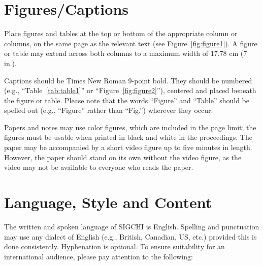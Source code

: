 \documentclass{sigchi}
\begin{document}
\section{Figures/Captions}

Place figures and tables at the top or bottom of the appropriate
column or columns, on the same page as the relevant text
(see Figure~\ref{fig:figure1}). A figure or table may extend across both
columns to a maximum width of 17.78 cm (7 in.).

Captions should be Times New Roman 9-point bold. They should be numbered (e.g.,
``Table~\ref{tab:table1}'' or ``Figure~\ref{fig:figure2}''), centered
and placed beneath the figure or table. Please note that the words
``Figure'' and ``Table'' should be spelled out (e.g., ``Figure''
rather than ``Fig.'') wherever they occur.

Papers and notes may use color figures, which are included in the page
limit; the figures must be usable when printed in black and white in
the proceedings. The paper may be accompanied by a short video figure
up to five minutes in length. However, the paper should stand on its
own without the video figure, as the video may not be available to
everyone who reads the paper.

\section{Language, Style and Content}

The written and spoken language of SIGCHI is English. Spelling and
punctuation may use any dialect of English (e.g., British, Canadian,
US, etc.) provided this is done consistently. Hyphenation is
optional. To ensure suitability for an international audience, please
pay attention to the following:
\end{document}
